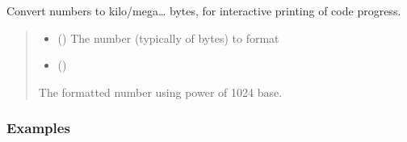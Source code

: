 \documentclass[letterpaper,10pt,english]{sphinxmanual}
\begin{document}

\begin{fulllineitems}
\label{\detokenize{misc:glomar_gridding.utils.sizeof_fmt}}
\pysigstartsignatures
\pysiglinewithargsret
{}
{\sphinxparamcomma {}}
{}
\pysigstopsignatures
\sphinxAtStartPar
Convert numbers to kilo/mega… bytes, for interactive printing of code
progress.
\begin{quote}\begin{description}
\begin{itemize}
\item {}
\sphinxAtStartPar
{} () \textendash{} The number (typically of bytes) to format

\item {}
\sphinxAtStartPar
{} ()

\end{itemize}

\sphinxAtStartPar
The formatted number using power of 1024 base.

\sphinxAtStartPar
{}

\end{description}\end{quote}
\subsubsection*{Examples}

\begin{sphinxVerbatim}[commandchars=\\\{\}]
\end{sphinxVerbatim}

\end{fulllineitems}
\end{document}
